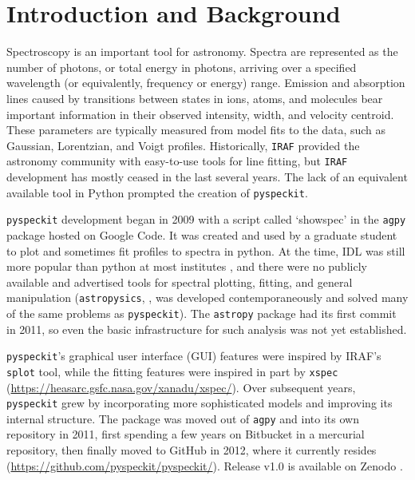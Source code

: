 \documentclass[twocolumn,linenumbers]{aastex63}
\newcommand{\pyspeckit}{\texttt{pyspeckit}\xspace}
\newcommand{\astropy}{\texttt{astropy}\xspace}
\begin{document}
\section{Introduction and Background}
Spectroscopy is an important tool for astronomy. Spectra are represented as
the number of photons, or total energy in photons, arriving over a specified
wavelength (or equivalently, frequency or energy) range. Emission and
absorption lines caused by transitions between states in ions, atoms, and molecules bear important information
in their observed intensity, width, and velocity centroid. These parameters are
typically measured from model fits to the data, such as Gaussian, Lorentzian,
and Voigt profiles. Historically, \texttt{IRAF} \citep{iraf} provided the astronomy
community with easy-to-use tools for line fitting, but \texttt{IRAF}
development has mostly ceased in the last several years.
The lack of an equivalent available
tool in Python prompted the creation of \pyspeckit.


\pyspeckit development began in 2009 with a script called `showspec' in the
\texttt{agpy} package hosted on Google Code. It was created and used by a
graduate student to plot and sometimes fit profiles to spectra in python. At
the time, IDL was still more popular than python at most institutes
\citep[the first evidence
that python had overtaken IDL in popularity among astronomers was presented in
][]{Momcheva2015a}, and there were no publicly available and advertised
tools for spectral plotting, fitting, and general manipulation
(\texttt{astropysics}, \citealt{Tollerud2012a}, was developed contemporaneously and
solved many of the same problems as \pyspeckit). The \astropy package
\citep{AstropyCollaboration2013,AstropyCollaboration2018} had its first commit in
2011, so even the basic infrastructure for such analysis was
not yet established.

\pyspeckit's graphical user interface (GUI) features were inspired by IRAF's
\texttt{splot} tool, while the fitting features were inspired in part by \texttt{xspec}
(\url{https://heasarc.gsfc.nasa.gov/xanadu/xspec/}).  Over subsequent years,
\pyspeckit grew by incorporating more sophisticated models  and improving its
internal structure.  The package was moved out of \texttt{agpy} and into its
own repository in 2011, first spending a few years on Bitbucket in a mercurial
repository, then finally moved to GitHub in 2012, where it currently resides (\url{https://github.com/pyspeckit/pyspeckit/}).
Release v1.0 is available on Zenodo \citep{pyspeckitV1}.
\end{document}
